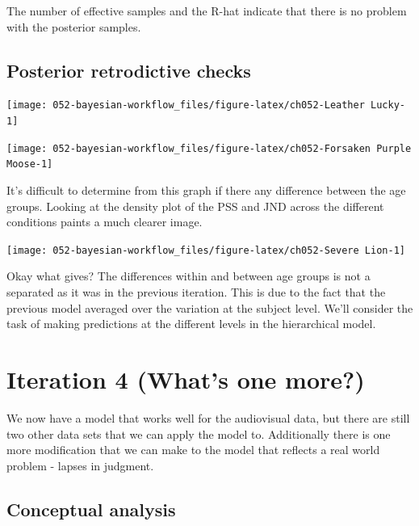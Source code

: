 \documentclass[11pt, oneside, openany]{scrbook}
\begin{document}
The number of effective samples and the R-hat indicate that there is no problem with the posterior samples.

\hypertarget{posterior-retrodictive-checks}{%
\subsection{Posterior retrodictive checks}\label{posterior-retrodictive-checks}}

\begin{center}\texttt{[image: 052-bayesian-workflow\_files/figure-latex/ch052-Leather Lucky-1]} \end{center}

\begin{center}\texttt{[image: 052-bayesian-workflow\_files/figure-latex/ch052-Forsaken Purple Moose-1]} \end{center}

It's difficult to determine from this graph if there any difference between the age groups. Looking at the density plot of the PSS and JND across the different conditions paints a much clearer image.

\begin{center}\texttt{[image: 052-bayesian-workflow\_files/figure-latex/ch052-Severe Lion-1]} \end{center}

Okay what gives? The differences within and between age groups is not a separated as it was in the previous iteration. This is due to the fact that the previous model averaged over the variation at the subject level. We'll consider the task of making predictions at the different levels in the hierarchical model.

\hypertarget{iteration-4-whats-one-more}{%
\section{Iteration 4 (What's one more?)}\label{iteration-4-whats-one-more}}

We now have a model that works well for the audiovisual data, but there are still two other data sets that we can apply the model to. Additionally there is one more modification that we can make to the model that reflects a real world problem - lapses in judgment.

\hypertarget{conceptual-analysis}{%
\subsection{Conceptual analysis}\label{conceptual-analysis}}
\end{document}
